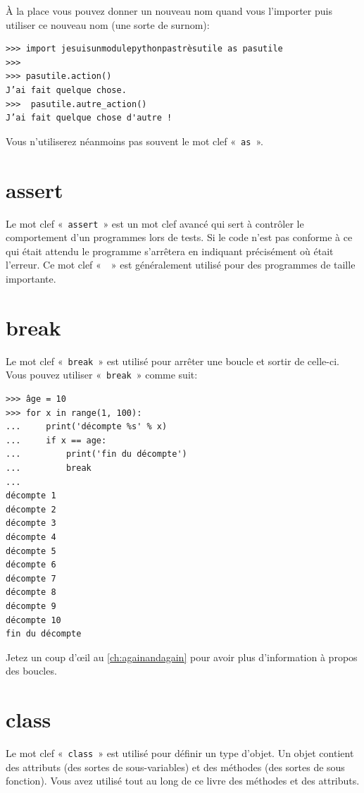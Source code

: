 À la place vous pouvez donner un nouveau nom quand vous l'importer puis utiliser ce nouveau nom (une sorte de surnom):

\begin{Verbatim}[frame=single,rulecolor=\color{gray}]
>>> import jesuisunmodulepythonpastrèsutile as pasutile
>>>
>>> pasutile.action()
J’ai fait quelque chose.
>>>  pasutile.autre_action()
J’ai fait quelque chose d'autre !
\end{Verbatim}

Vous n'utiliserez néanmoins pas souvent le mot clef «~\texttt{as}~».

\section*{assert}

Le mot clef «~\texttt{assert}~» est un mot clef avancé qui sert à contrôler le comportement d'un programmes lors de tests. Si le code n'est pas conforme à ce qui était attendu le programme s'arrêtera en indiquant précisément où était l'erreur. Ce mot clef «~\texttt{}~» est généralement utilisé pour des programmes de taille importante.

\section*{break}
Le mot clef «~\texttt{break}~» est utilisé pour arrêter une boucle et sortir de celle-ci. Vous pouvez utiliser «~\texttt{break}~» comme suit:
\begin{Verbatim}[frame=single,rulecolor=\color{gray}]
>>> âge = 10
>>> for x in range(1, 100):
...     print('décompte %s' % x)
...     if x == age:
...         print('fin du décompte')
...         break
...
décompte 1
décompte 2
décompte 3
décompte 4
décompte 5
décompte 6
décompte 7
décompte 8
décompte 9
décompte 10
fin du décompte
\end{Verbatim}

Jetez un coup d'œil au \autoref{ch:againandagain} pour avoir plus d'information à propos des boucles.

\section*{class}

Le mot clef «~\texttt{class}~»  est utilisé pour définir un type d'objet. Un objet contient des attributs (des sortes de sous-variables) et des méthodes (des sortes de sous fonction). Vous avez utilisé tout au long de ce livre des méthodes et des attributs. 


